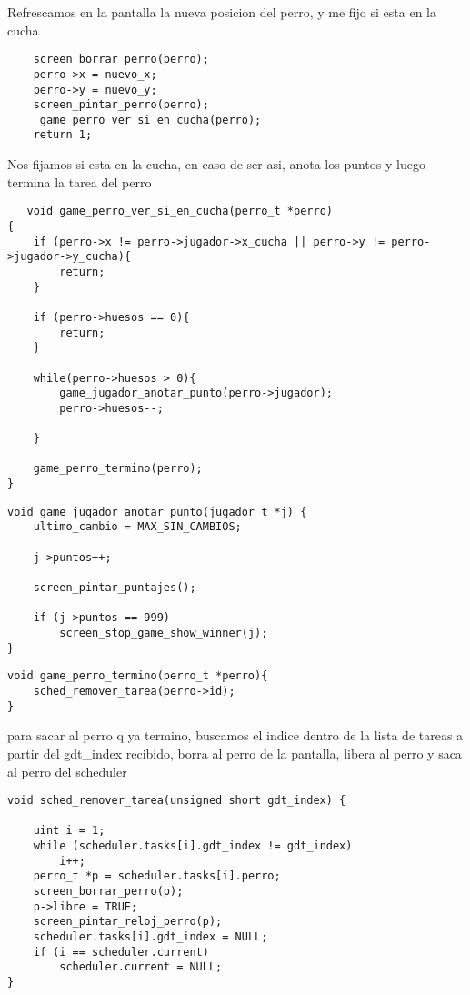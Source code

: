  Refrescamos en la pantalla la nueva posicion del perro, y me fijo si esta en la cucha
  \begin{codesnippet}
\begin{verbatim}
    screen_borrar_perro(perro);
    perro->x = nuevo_x;
    perro->y = nuevo_y;
    screen_pintar_perro(perro);
     game_perro_ver_si_en_cucha(perro);
    return 1;
       \end{verbatim}
\end{codesnippet}
   
Nos fijamos si esta en la cucha, en caso de ser asi, anota los puntos y luego termina la tarea del perro
  \begin{codesnippet}
\begin{verbatim}
   void game_perro_ver_si_en_cucha(perro_t *perro)
{
    if (perro->x != perro->jugador->x_cucha || perro->y != perro->jugador->y_cucha){
        return;
    }

    if (perro->huesos == 0){
        return;
    }

    while(perro->huesos > 0){
        game_jugador_anotar_punto(perro->jugador);
        perro->huesos--;

    }
  
    game_perro_termino(perro);
}
       \end{verbatim}
\end{codesnippet}
\begin{codesnippet}
\begin{verbatim}
void game_jugador_anotar_punto(jugador_t *j) {
    ultimo_cambio = MAX_SIN_CAMBIOS;

    j->puntos++;

    screen_pintar_puntajes();

    if (j->puntos == 999)
        screen_stop_game_show_winner(j);
}
 \end{verbatim}
\end{codesnippet}
\begin{codesnippet}
\begin{verbatim}
void game_perro_termino(perro_t *perro){
    sched_remover_tarea(perro->id);
}
 \end{verbatim}
\end{codesnippet}

para sacar al perro q ya termino, buscamos el indice dentro de la lista de tareas a partir del gdt\_index recibido,
borra al perro de la pantalla, libera al perro y saca al perro del scheduler
\begin{codesnippet}
\begin{verbatim}
void sched_remover_tarea(unsigned short gdt_index) {

    uint i = 1;
    while (scheduler.tasks[i].gdt_index != gdt_index)
        i++;
    perro_t *p = scheduler.tasks[i].perro;
    screen_borrar_perro(p);
    p->libre = TRUE;
    screen_pintar_reloj_perro(p);
    scheduler.tasks[i].gdt_index = NULL;
    if (i == scheduler.current)
        scheduler.current = NULL;
}
 \end{verbatim}
\end{codesnippet}

